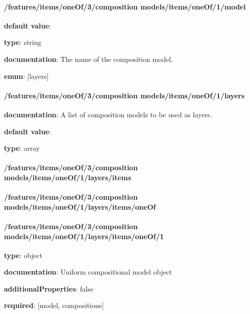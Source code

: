 \paragraph{/features/items/oneOf/3/composition models/items/oneOf/1/model} \begin{itemized}
\item {\bf default value}: 
\item {\bf type}: string
\item {\bf documentation}: The name of the composition model.
\item {\bf enum}: [layers]\end{itemized}\paragraph{/features/items/oneOf/3/composition models/items/oneOf/1/layers} \begin{itemized}
\item {\bf documentation}: A list of composition models to be used as layers.
\item {\bf default value}: 
\item {\bf type}: array
\paragraph{/features/items/oneOf/3/composition models/items/oneOf/1/layers/items} \begin{itemized}
\end{itemized}\end{itemized}\paragraph{/features/items/oneOf/3/composition models/items/oneOf/1/layers/items/oneOf} \begin{itemized}
\end{itemized}\paragraph{/features/items/oneOf/3/composition models/items/oneOf/1/layers/items/oneOf/1} \begin{itemized}
\item {\bf type}: object
\item {\bf documentation}: Uniform compositional model object
\item {\bf additionalProperties}: false
\item {\bf required}: [model, compositions]\end{itemized}
